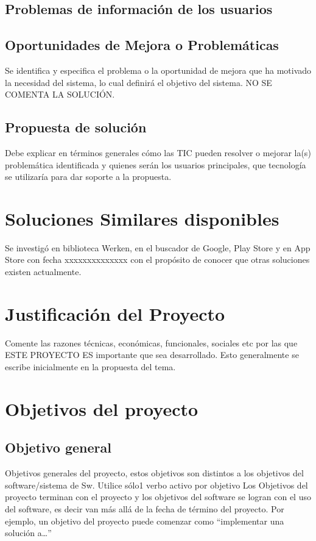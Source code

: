 \subsection{Problemas de información de los usuarios}

\subsection{Oportunidades de Mejora o Problemáticas}

Se identifica y especifica el problema o la oportunidad de mejora que ha motivado la necesidad del sistema, lo cual definirá el objetivo del sistema. NO SE COMENTA LA SOLUCIÓN.

\subsection{Propuesta de solución}

Debe explicar en términos generales cómo las TIC pueden resolver o mejorar la(s) problemática identificada y quienes serán los usuarios principales, que tecnología se utilizaría para dar soporte a la propuesta. 

\section{Soluciones Similares disponibles}

Se investigó en biblioteca Werken, en el buscador de Google, Play Store y en App Store con fecha xxxxxxxxxxxxxx con el propósito de conocer que otras soluciones existen actualmente. 


\section{Justificación del Proyecto}

Comente las razones técnicas, económicas, funcionales, sociales etc por las que ESTE PROYECTO ES importante que sea desarrollado.
Esto generalmente se escribe inicialmente en la propuesta del tema.


\section{Objetivos del proyecto}
\subsection{Objetivo general}

Objetivos generales del proyecto, estos objetivos son distintos a los objetivos del software/sistema de Sw. Utilice sólo1 verbo activo por objetivo
Los Objetivos del proyecto terminan con el proyecto y los objetivos del software se logran con el uso del software, es decir van más allá de la fecha de término del proyecto. 
Por ejemplo, un objetivo del proyecto puede comenzar como “implementar una solución a…”


